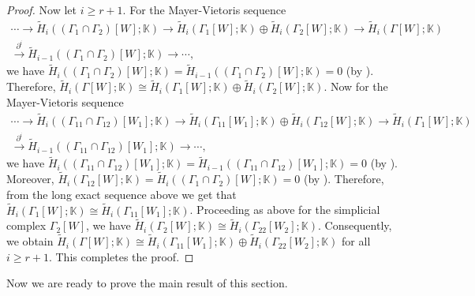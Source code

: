\documentclass[12pt,reqno]{amsart}
\theoremstyle{definition}
\newcommand{\K}{\mathbb K}
\begin{document}
\begin{proof}
    Now let $i\ge r+1$. For the Mayer-Vietoris sequence
    {\footnotesize
    \begin{equation*}
    \begin{split}
        \cdots \rightarrow\widetilde H_{i}((\Gamma_1\cap\Gamma_2)[W];\K)\rightarrow \widetilde H_{i}(\Gamma_1[W];\K)\oplus \widetilde H_{i}(\Gamma_2[W];\K)
        \rightarrow \widetilde H_{i}(\Gamma[W];\K)\\
        \xrightarrow{\partial^{i}} \widetilde H_{i-1}((\Gamma_1\cap\Gamma_2)[W];\K)\rightarrow\cdots,
    \end{split}
    \end{equation*}} 
    we have $\widetilde H_{i}((\Gamma_1\cap\Gamma_2)[W];\K)=\widetilde H_{i-1}((\Gamma_1\cap\Gamma_2)[W];\K)=0$ (by ). Therefore, $\widetilde H_{i}(\Gamma[W];\K)\cong \widetilde H_{i}(\Gamma_1[W];\K)\oplus \widetilde H_{i}(\Gamma_2[W];\K)$. Now for the Mayer-Vietoris sequence 
{\footnotesize
\begin{equation*}
    \begin{split}
        \cdots \rightarrow \widetilde H_{i}((\Gamma_{11}\cap\Gamma_{12})[W_1];\K)\rightarrow \widetilde H_{i}(\Gamma_{11}[W_1];\K)\oplus \widetilde H_{i}(\Gamma_{12}[W];\K)
        \rightarrow \widetilde H_{i}(\Gamma_1[W];\K)\\
        \xrightarrow{\partial^{i}} \widetilde H_{i-1}((\Gamma_{11}\cap\Gamma_{12})[W_1];\K)\rightarrow\cdots,
    \end{split}
    \end{equation*}}
we have $\widetilde H_{i}((\Gamma_{11}\cap\Gamma_{12})[W_1];\K)=\widetilde H_{i-1}((\Gamma_{11}\cap\Gamma_{12})[W_1];\K)=0$ (by ). Moreover, $\widetilde H_{i}(\Gamma_{12}[W];\K)=\widetilde H_{i}((\Gamma_{1}\cap\Gamma_2)[W];\K)=0$ (by ).  Therefore, from the long exact sequence above we get that $\widetilde H_{i}(\Gamma_1[W];\K)\cong \widetilde H_{i}(\Gamma_{11}[W_1];\K)$. Proceeding as above for the simplicial complex $\Gamma_2[W]$, we have $\widetilde H_{i}(\Gamma_2[W];\K)\cong \widetilde H_{i}(\Gamma_{22}[W_2];\K)$. Consequently, we obtain $\widetilde H_{i}(\Gamma[W];\K)\cong \widetilde H_{i}(\Gamma_{11}[W_1];\K)\oplus \widetilde H_{i}(\Gamma_{22}[W_2];\K)$ for all $i\ge r+1$. This completes the proof.

\end{proof}

Now we are ready to prove the main result of this section.
\end{document}
